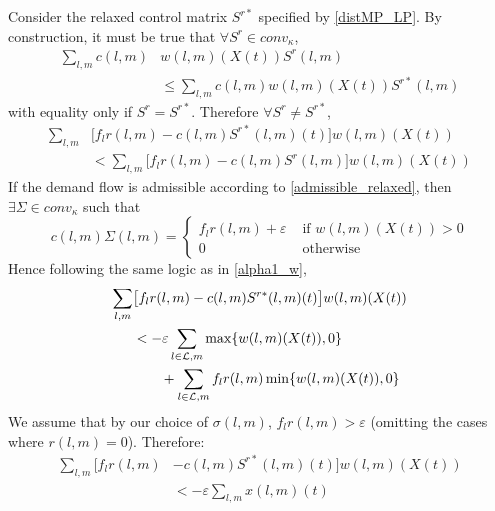 Consider the relaxed control matrix $S^{r*}$ specified by \eqref{distMP_LP}. By construction, it must be true that $ \forall S^r \in conv_{\kappa}$, 
\begin{align} \nonumber
\sum_{l,m}c(l,m)& w(l,m)(X(t))S^r (l,m) \\
&\leq \sum_{l,m}c(l,m)w(l,m)(X(t))S^{r*}(l,m) 
\end{align}
with equality only if $S^r = S^{r*}$. 
Therefore $\forall S^r \neq S^{r*}$,
\begin{align} \nonumber
 \sum_{l,m}&\big[f_{l}r(l,m) - c(l,m)S^{r*}(l,m)(t)\big]w(l,m)(X(t)) \\
&<   \sum_{l,m}\big[f_{l}r(l,m) - c(l,m)S^r(l,m)\big]w(l,m)(X(t))
\end{align}
If the demand flow is admissible according to \eqref{admissible_relaxed}, then 
$\exists \Sigma \in conv_{\kappa}$ such that 
\begin{equation} \nonumber
c(l,m)\Sigma(l,m) = \begin{cases}
        f_{l}r(l,m) + \varepsilon & \text{ if } w(l,m)(X(t)) > 0 \\
        0 & \text{ otherwise}
    \end{cases}
\end{equation}
Hence following the same logic as in \eqref{alpha1_w}, 
\begin{align} \nonumber
 \sum_{l,m}&\big[f_{l}r(l,m) -  c(l,m)S^{r*}(l,m)(t)\big] w(l,m)(X(t))  \\ \nonumber
&  < -\varepsilon \sum_{l \in \mathcal{L},m} \max\{w(l,m)(X(t)) ,0\} \\
&\qquad +  \sum_{l \in \mathcal{L},m}  f_l r(l,m)  \min\{ w(l,m)(X(t)) ,0\}
\end{align}
We assume that by our choice of $\sigma(l,m)$, $f_{l}r(l,m) > \varepsilon$ (omitting the cases where $r(l,m) = 0$). Therefore:
\begin{align}\nonumber
\sum_{l,m}\big[ f_{l}r(l,m) & - c(l,m)S^{r*}(l,m)(t)\big]w(l,m)(X(t)) \\
&< -\varepsilon \displaystyle\sum_{l,m} x(l,m)(t)
\end{align}

